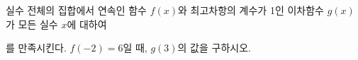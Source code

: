 실수 전체의 집합에서 연속인 함수 $f(x)$와 최고차항의 계수가 1인 이차함수 $g(x)$가 모든 실수 $x$에 대하여 \par\smallskip{}\par\smallskip\noindent 를 만족시킨다. $f(-2)=6$일 때, $g(3)$의 값을 구하시오.
